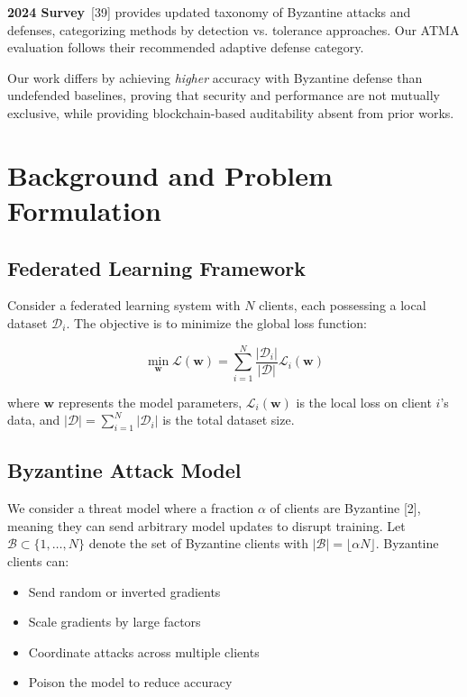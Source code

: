 \documentclass[12pt,a4paper,onecolumn]{article}
\begin{document}
\textbf{2024 Survey}~[39] provides updated taxonomy of Byzantine attacks and defenses, categorizing methods by detection vs. tolerance approaches. Our ATMA evaluation follows their recommended adaptive defense category.

Our work differs by achieving \textit{higher} accuracy with Byzantine defense than undefended baselines, proving that security and performance are not mutually exclusive, while providing blockchain-based auditability absent from prior works.

\section{Background and Problem Formulation}
\label{sec:background}

\subsection{Federated Learning Framework}

Consider a federated learning system with $N$ clients, each possessing a local dataset $\mathcal{D}_i$. The objective is to minimize the global loss function:

\begin{equation}
\min_{\mathbf{w}} \mathcal{L}(\mathbf{w}) = \sum_{i=1}^{N} \frac{|\mathcal{D}_i|}{|\mathcal{D}|} \mathcal{L}_i(\mathbf{w})
\label{eq:global_loss}
\end{equation}

where $\mathbf{w}$ represents the model parameters, $\mathcal{L}_i(\mathbf{w})$ is the local loss on client $i$'s data, and $|\mathcal{D}| = \sum_{i=1}^{N} |\mathcal{D}_i|$ is the total dataset size.

\subsection{Byzantine Attack Model}

We consider a threat model where a fraction $\alpha$ of clients are Byzantine [2], meaning they can send arbitrary model updates to disrupt training. Let $\mathcal{B} \subset \{1, \ldots, N\}$ denote the set of Byzantine clients with $|\mathcal{B}| = \lfloor \alpha N \rfloor$. Byzantine clients can:

\begin{itemize}
    \item Send random or inverted gradients
    \item Scale gradients by large factors
    \item Coordinate attacks across multiple clients
    \item Poison the model to reduce accuracy
\end{itemize}
\end{document}
